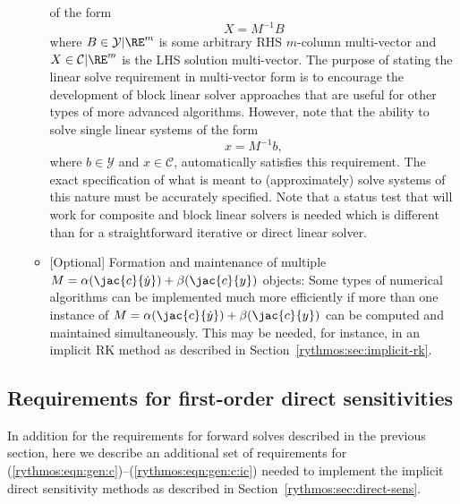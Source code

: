 \documentclass[pdf,ps2pdf,11pt]{SANDreport}
\begin{document}
\begin{itemize}
\begin{itemize}
of the form
\[
X = M^{-1} B
\]
where $B\in\mathcal{Y}|\RE^m$ is some arbitrary RHS $m$-column multi-vector
and $X\in\mathcal{C}|\RE^m$ is the LHS solution multi-vector.  The purpose of
stating the linear solve requirement in multi-vector form is to encourage the
development of block linear solver approaches that are useful for other types
of more advanced algorithms.  However, note that the ability to solve single
linear systems of the form
\[
x = M^{-1} b,
\]
where $b\in\mathcal{Y}$ and $x\in\mathcal{C}$, automatically satisfies this
requirement.  The exact specification of what is meant to (approximately)
solve systems of this nature must be accurately specified. Note that a status
test that will work for composite and block linear solvers is needed which is
different than for a straightforward iterative or direct linear solver.
%
{}\item{} [Optional] Formation and maintenance of multiple $M = {}\alpha
(\jac{c}{\dot{y}}) + {}\beta (\jac{c}{y})$ objects: Some types of numerical
algorithms can be implemented much more efficiently if more than one instance
of $M = {}\alpha (\jac{c}{\dot{y}}) + {}\beta (\jac{c}{y})$ can be computed
and maintained simultaneously.  This may be needed, for instance, in an
implicit RK method as described in Section~\ref{rythmos:sec:implicit-rk}.
%
\end{itemize}

\end{itemize}

\subsection{Requirements for first-order direct sensitivities}

In addition for the requirements for forward solves described in the previous
section, here we describe an additional set of requirements for
(\ref{rythmos:eqn:gen:c})--(\ref{rythmos:eqn:gen:c:ic}) needed to implement
the implicit direct sensitivity methods as described in
Section~\ref{rythmos:sec:direct-sens}.
\end{document}
